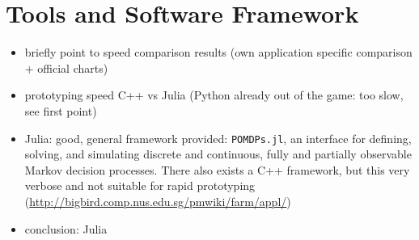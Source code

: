 
\section{Tools and Software Framework}

\begin{itemize}
  \item briefly point to speed comparison results (own application specific comparison + official charts)
  \item prototyping speed C++ vs Julia (Python already out of the game: too slow, see first point)
  \item Julia: good, general framework provided: \texttt{POMDPs.jl}, an interface for
  defining, solving, and simulating discrete and continuous, fully and
  partially observable Markov decision processes.  \cite{egorov2017pomdps}
  There also exists a C++ framework, but this very verbose and not suitable for
  rapid prototyping (\url{http://bigbird.comp.nus.edu.sg/pmwiki/farm/appl/})
  \item conclusion: Julia \cite{bezanson2017julia}
\end{itemize}
